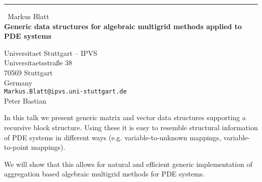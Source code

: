 \documentclass{report}
\begin{document}
\begin{center}
\rule{6in}{1pt} \
{\large Markus Blatt \\
{\bf Generic data structures for algebraic multigrid methods applied to PDE systems}}

Universitaet Stuttgart – IPVS \\ Universitaetsstraße 38 \\ 70569 Stuttgart \\ Germany
\\
{\tt Markus.Blatt@ipvs.uni-stuttgart.de}\\
Peter Bastian\end{center}

In this talk we present generic matrix and vector data structures
supporting a recursive block structure. Using these it is easy to
resemble structural information of PDE systems in different ways
(e.g. variable-to-unknown mappings, variable-to-point mappings).

We will show that this allows for natural and efficient generic
implementation of aggregation based algebraic multigrid methods for PDE
systems.
\end{document}
